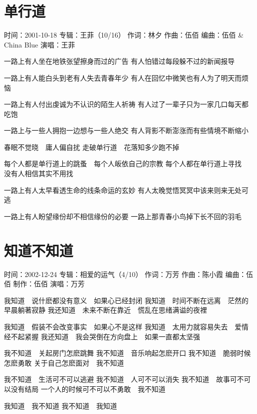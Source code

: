 \documentclass[UTF8,a4paper,oneside,twocolumn,12pt]{ctexbook}
\newcommand{\infopair}[2]{\textbullet #1：#2}
\newcommand{\zc}[1][伍佰]{\infopair{作词}{#1}}
\newcommand{\zq}[1][伍佰]{\infopair{作曲}{#1}}
\newcommand{\bq}[1][伍佰]{\infopair{编曲}{#1}}
\newcommand{\zj}[1]{\infopair{专辑}{#1}}
\newcommand{\zz}[1]{\infopair{制作}{#1}}
\newcommand{\sj}[1]{\infopair{时间}{#1}}
\newenvironment{info}{\begin{flushleft}\kaishu
	}
	{\end{flushleft}\normalsize\yahei\par}
\newenvironment{lyric}{
	}
{}
\begin{document}
\section{单行道}
\begin{info}
	\sj{2001-10-18}
	\zj{王菲（10/16）}
	\zc[林夕]
	\zq
	\bq[伍佰 \& China Blue]
	\infopair{演唱}{王菲}
\end{info}
\begin{lyric}
	一路上有人坐在地铁张望擦身而过的广告
	有人怕错过每段躲不过的新闻报导

	一路上有人能白头到老有人失去青春年少
	有人在回忆中微笑也有人为了明天而烦恼

	一路上有人付出虔诚为不认识的陌生人祈祷
	有人过了一辈子只为一家几口每天都吃饱

	一路上与一些人拥抱一边想与一些人绝交
	有人背影不断澎涨而有些情境不断缩小

	春眠不觉晓　庸人偏自扰
	走破单行道　花落知多少跑不掉

	每个人都是单行道上的跳蚤　每个人皈依自己的宗教
	每个人都在单行道上寻找　没有人相信其实不用找

	一路上有人太早看透生命的线条命运的玄妙
	有人太晚觉悟冥冥中该来则来无处可逃

	一路上有人盼望缘份却不相信缘份的必要
	一路上那青春小鸟掉下长不回的羽毛
\end{lyric}

\section{知道不知道}
\begin{info}
	\sj{2002-12-24}
	\zj{相爱的运气（4/10）}
	\zc[万芳]
	\zq[陈小霞]
	\bq[伍佰]
	\zz{伍佰}
	\infopair{演唱}{万芳}
\end{info}
\begin{lyric}
	我知道　说什麽都没有意义　如果心已经封闭
	我知道　时间不断在远离　茫然的早晨躺著寂静
	我还知道　未来不断在靠近　慌乱在思绪满谥的夜裡

	我知道　假装不会改变事实　如果心不是这样
	我知道　太用力就容易失去　爱情经不起紧握
	我还知道　我会哭倒在方向盘上　如果一直都太坚强

	我不知道　关起房门怎麽跳舞
	我不知道　音乐响起怎麽开口
	我不知道　脆弱时候怎麽勇敢
	关于自己怎麽面对　我不知道

	我不知道　生活可不可以逃避
	我不知道　人可不可以消失
	我不知道　故事可不可以没有结局
	一个人的时候可不可以不勇敢　我不知道

	我知道　我不知道
	我不知道　我知道
\end{lyric}
\end{document}
